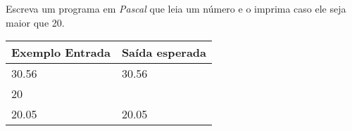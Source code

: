 \item Escreva um programa em \emph{Pascal} que leia um número e o imprima 
caso ele seja maior que 20.

\begin{center}
\begin{tabular}{|l|l|} \hline
Exemplo Entrada & Saída esperada \\ \hline
30.56           & 30.56          \\ \hline
20              &                \\ \hline
20.05           & 20.05          \\ \hline
\end{tabular}
\end{center}